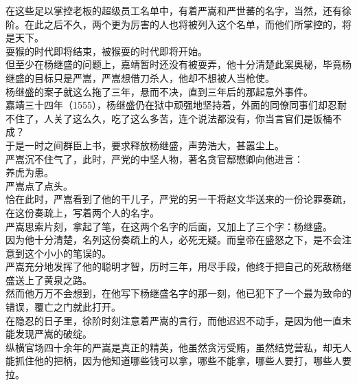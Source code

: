 \begin{multicols}{\theparacolNo}
在这些足以掌控老板的超级员工名单中，有着严嵩和严世蕃的名字，当然，还有徐阶。在此之后不久，两个更为厉害的人也将被列入这个名单，而他们所掌控的，将是天下。\\

耍猴的时代即将结束，被猴耍的时代即将开始。\\

但至少在杨继盛的问题上，嘉靖暂时还没有被耍弄，他十分清楚此案奥秘，毕竟杨继盛的目标只是严嵩，严嵩想借刀杀人，他却不想被人当枪使。\\

杨继盛的案子就这么拖了三年，悬而不决，直到三年后的那起意外事件。\\

嘉靖三十四年（1555），杨继盛仍在狱中顽强地坚持着，外面的同僚同事们却忍耐不住了，人关了这么久，吃了这么多苦，连个说法都没有，你当言官们是饭桶不成？\\

于是一时之间群臣上书，要求释放杨继盛，声势浩大，甚嚣尘上。\\

严嵩沉不住气了，此时，严党的中坚人物，著名贪官鄢懋卿向他进言：\\

养虎为患。\\

严嵩点了点头。\\

恰在此时，严嵩看到了他的干儿子，严党的另一干将赵文华送来的一份论罪奏疏，在这份奏疏上，写着两个人的名字。\\

严嵩思索片刻，拿起了笔，在这两个名字的后面，又加上了三个字：杨继盛。\\

因为他十分清楚，名列这份奏疏上的人，必死无疑。而皇帝在盛怒之下，是不会注意到这个小小的笔误的。\\

严嵩充分地发挥了他的聪明才智，历时三年，用尽手段，他终于把自己的死敌杨继盛送上了黄泉之路。\\

然而他万万不会想到，在他写下杨继盛名字的那一刻，他已犯下了一个最为致命的错误，覆亡之门就此打开。\\

在隐忍的日子里，徐阶时刻注意着严嵩的言行，而他迟迟不动手，是因为他一直未能发现严嵩的破绽。\\

纵横官场四十余年的严嵩是真正的精英，他虽然贪污受贿，虽然结党营私，却无人能抓住他的把柄，因为他知道哪些钱可以拿，哪些不能拿，哪些人要打，哪些人要拉。\\


\end{multicols}
